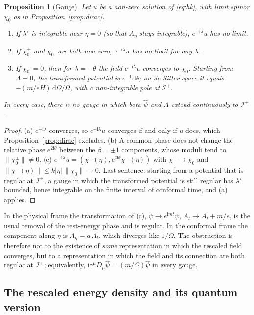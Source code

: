 \documentclass[11pt,a4paper]{article}
\newtheorem{proposition}{Proposition}
\theoremstyle{definition}
\newcommand{\scri}{\mathscr{I}^{+}}
\newcommand{\dd}{\mathrm{d}}
\newcommand{\ii}{\mathrm{i}}
\newcommand{\hpsi}{\hat\psi}
\begin{document}
\begin{proposition}[Gauge]
\label{prop:gauge}
Let $u$ be a non-zero solution of \eqref{eq:hk}, with limit spinor $\chi_{0}$ as in Proposition~\ref{prop:dirac}.
\begin{enumerate}[label=(\alph*)]
\item If $\lambda'$ is integrable near $\eta=0$ (so that $A_{\eta}$ stays integrable), $e^{-\ii\lambda}u$ has no limit.
\item If $\chi_{0}^{+}$ and $\chi_{0}^{-}$ are both non-zero, $e^{-\ii\lambda}u$ has no limit for any $\lambda$.
\item If $\chi_{0}^{-}=0$, then for $\lambda=-\theta$ the field $e^{-\ii\lambda}u$ converges to $\chi_{0}$. Starting from $A=0$, the transformed potential is $e^{-1}\dd\theta$; on de Sitter space it equals $-(m/eH)\,\dd\Omega/\Omega$, with a non-integrable pole at $\scri$.
\end{enumerate}
In every case, there is no gauge in which both $\hpsi$ and $A$ extend continuously to $\scri$.
\end{proposition}
\begin{proof}
(a) $e^{-\ii\lambda}$ converges, so $e^{-\ii\lambda}u$ converges if and only if $u$ does, which Proposition~\ref{prop:dirac} excludes. (b) A common phase does not change the relative phase $e^{2\ii\theta}$ between the $\beta=\pm1$ components, whose moduli tend to $\|\chi_{0}^{\pm}\|\neq0$. (c) $e^{-\ii\lambda}u=(\chi^{+}(\eta),e^{2\ii\theta}\chi^{-}(\eta))$ with $\chi^{+}\to\chi_{0}$ and $\|\chi^{-}(\eta)\|\le k|\eta|\,\|\chi_{0}\|\to0$. Last sentence: starting from a potential that is regular at $\scri$, a gauge in which the transformed potential is still regular has $\lambda'$ bounded, hence integrable on the finite interval of conformal time, and (a) applies.
\end{proof}

In the physical frame the transformation of (c), $\psi\to e^{\ii mt}\psi$, $A_{t}\to A_{t}+m/e$, is the usual removal of the rest-energy phase and is regular. In the conformal frame the component along $\eta$ is $A_{\eta}=a\,A_{t}$, which diverges like $1/\Omega$. The obstruction is therefore not to the existence of \emph{some} representation in which the rescaled field converges, but to a representation in which the field and its connection are both regular at $\scri$; equivalently, $\ii\gamma^{\mu}D_{\mu}\hpsi=(m/\Omega)\hpsi$ in every gauge.

\subsection{The rescaled energy density and its quantum version}
\label{sec:energy}
\end{document}
